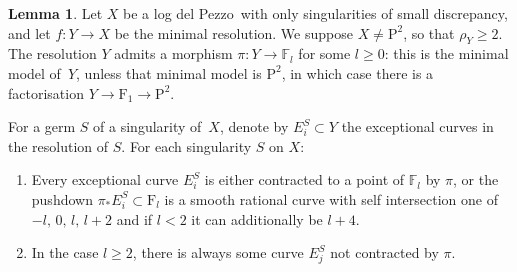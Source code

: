\documentclass[11pt]{amsbook}
\theoremstyle{definition}
\theoremstyle{definition}
\theoremstyle{definition}
\theoremstyle{definition}
\theoremstyle{definition}
\newtheorem{lem}[thm]{Lemma}
\theoremstyle{definition}
\theoremstyle{definition}
\theoremstyle{definition}
\newcommand{\ldp}{log del Pezzo}
\newcommand{\mb}[1]{\mathbb{#1}}
\newcommand{\minres}{minimal resolution}
\newcommand{\F}{\mathrm{F}}
\renewcommand{\P}{\mathrm{P}}
\begin{document}
\begin{lem}\label{HSlem}
Let $X$ be a \ldp\ with only singularities of small discrepancy, and
let $f \colon Y \rightarrow X$ be the \minres. We suppose $X\not=\P^2$, so that $\rho_Y\ge2$.
The resolution $Y$ admits a morphism $\pi \colon Y \rightarrow \mathbb{F}_l$ for some $l\ge0$:
this is the minimal model of~$Y$, unless that minimal model
is $\P^2$, in which case there is a factorisation
$Y\rightarrow \F_1\rightarrow\P^2$.

For a germ $S$ of a singularity of~$X$, denote by
$E_i^S \subset Y$ the exceptional curves in the resolution of $S$.
For each singularity $S$ on $X$:
\begin{enumerate}
\item
Every exceptional curve $E_i^S$ is either contracted to a point of $\mb{F}_l$ by $\pi$,
or the pushdown
$\pi_* E_i^S\subset\F_l$ is a smooth rational curve with self intersection one of $-l, \,0, \, l, \, l+2$ and if $l<2$ it can additionally be $l+4$.
\item
In the case $l\ge2$, there is always some curve $E_j^S$ not contracted by $\pi$.
\end{enumerate}

\end{lem}
\end{document}
